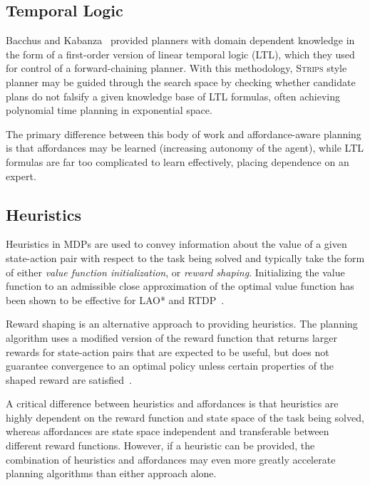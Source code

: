 \documentclass[conference]{IEEEtran}
\begin{document}
\subsection{Temporal Logic}

Bacchus and Kabanza~\cite{Bacchus95usingtemporal,Bacchus99usingtemporal} provided
planners with domain dependent knowledge in the form of a first-order version of linear
temporal logic (LTL), which they used for control of a forward-chaining planner. With this methodology, 
\textsc{Strips} style planner may be guided through the search space by checking 
whether candidate plans do not falsify a given knowledge base of LTL formulas, often
achieving polynomial time planning in exponential space.

The primary difference between this body of work and affordance-aware planning is that affordances may be learned (increasing autonomy of the agent), while LTL formulas are far too complicated to learn effectively, placing dependence on an expert.

\subsection{Heuristics}
Heuristics in MDPs are used to convey information about the value of a given state-action pair with respect to the task being solved and typically take the form of either {\em value function initialization},
or {\em reward shaping}. Initializing the value function to an admissible close approximation of the optimal value function has been shown to be effective for LAO* and RTDP~\cite{Hansen:1999qf}.

Reward shaping is an alternative approach to providing heuristics. The planning algorithm uses a modified version of the reward function that returns larger rewards for state-action pairs that are expected to be useful, but does not guarantee convergence to an optimal policy unless certain properties of the shaped reward are satisfied~\cite{potshap}.

A critical difference between heuristics and affordances is that heuristics are highly dependent on the reward function and state space of the task being solved, whereas affordances are state space independent and transferable between different reward functions. However, if a heuristic can be provided, the combination of heuristics and affordances may even more greatly accelerate planning algorithms than either approach alone.
\end{document}
